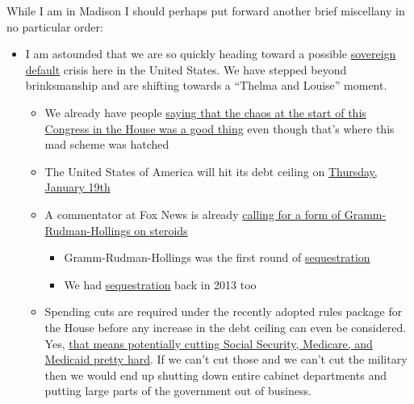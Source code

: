 While I am in Madison I should perhaps put forward another brief
miscellany in no particular order:

\begin{itemize}
\tightlist
\item
  I am astounded that we are so quickly heading toward a possible
  \href{https://en.wikipedia.org/w/index.php?title=Sovereign_default&oldid=1120195953}{sovereign
  default} crisis here in the United States. We have stepped beyond
  brinksmanship and are shifting towards a ``Thelma and Louise'' moment.

  \begin{itemize}
  \tightlist
  \item
    We already have people
    \href{https://web.archive.org/web/20230114165122/https://www.starbeacon.com/opinion/chaos-no-it-was-free-speech-in-the-house/article_c6d05a4a-9373-11ed-a9fe-5fed3d4dfa83.html}{saying
    that the chaos at the start of this Congress in the House was a good
    thing} even though that's where this mad scheme was hatched
  \item
    The United States of America will hit its debt ceiling on
    \href{https://www.theguardian.com/business/2023/jan/13/treasury-secretary-janet-yellen-debt-ceiling}{Thursday,
    January 19th}
  \item
    A commentator at Fox News is already
    \href{https://www.foxnews.com/opinion/house-republicans-right-no-debt-limit-increase-until-balanced-budget-plan-is-in-place}{calling
    for a form of Gramm-Rudman-Hollings on steroids}

    \begin{itemize}
    \tightlist
    \item
      Gramm-Rudman-Hollings was the first round of
      \href{https://en.wikipedia.org/w/index.php?title=2013_United_States_budget_sequestration&oldid=1127719102}{sequestration}
    \item
      We had
      \href{https://en.wikipedia.org/w/index.php?title=2013_United_States_budget_sequestration&oldid=1127719102}{sequestration}
      back in 2013 too
    \end{itemize}
  \item
    Spending cuts are required under the recently adopted rules package
    for the House before any increase in the debt ceiling can even be
    considered. Yes,
    \href{https://www.msnbc.com/opinion/msnbc-opinion/republicans-debt-ceiling-games-will-likely-backfire-rcna65339}{that
    means potentially cutting Social Security, Medicare, and Medicaid
    pretty hard}. If we can't cut those and we can't cut the military
    then we would end up shutting down entire cabinet departments and
    putting large parts of the government out of business.


\end{itemize}
\end{itemize}
